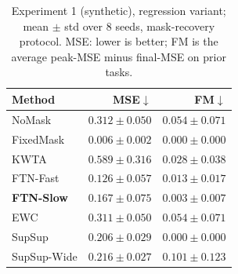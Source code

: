 \begin{table}[t]
\caption{Experiment 1 (synthetic), regression variant; mean $\pm$ std over 8 seeds, mask-recovery protocol. MSE: lower is better; FM is the average peak-MSE minus final-MSE on prior tasks.}
\label{tab:exp1reg}
\vskip 0.05in
\begin{center}\begin{small}\begin{sc}
\begin{tabular}{lrr}
\toprule
Method & MSE$\downarrow$ & FM$\downarrow$ \\
\midrule
NoMask & $0.312\pm0.050$ & $0.054\pm0.071$ \\
FixedMask & $0.006\pm0.002$ & $0.000\pm0.000$ \\
KWTA & $0.589\pm0.316$ & $0.028\pm0.038$ \\
FTN-Fast & $0.126\pm0.057$ & $0.013\pm0.017$ \\
\textbf{FTN-Slow} & $0.167\pm0.075$ & $0.003\pm0.007$ \\
EWC & $0.311\pm0.050$ & $0.054\pm0.071$ \\
SupSup & $0.206\pm0.029$ & $0.000\pm0.000$ \\
SupSup-Wide & $0.216\pm0.027$ & $0.101\pm0.123$ \\
\bottomrule
\end{tabular}
\end{sc}\end{small}\end{center}
\vskip -0.1in
\end{table}
